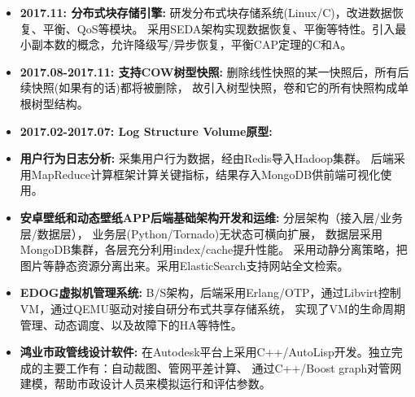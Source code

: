  \begin{itemize}[leftmargin=*]
      \item \textbf{2017.11: 分布式块存储引擎:} 研发分布式块存储系统(Linux/C)，改进数据恢复、平衡、QoS等模块。
          采用SEDA架构实现数据恢复、平衡等特性。引入最小副本数的概念，允许降级写/异步恢复，平衡CAP定理的C和A。

      \item \textbf{2017.08-2017.11: 支持COW树型快照:} 删除线性快照的某一快照后，所有后续快照(如果有的话)都将被删除，
          故引入树型快照，卷和它的所有快照构成单根树型结构。

      \item \textbf{2017.02-2017.07: Log Structure Volume原型:}

      \item \textbf{用户行为日志分析:} 采集用户行为数据，经由Redis导入Hadoop集群。
          后端采用MapReduce计算框架计算关键指标，结果存入MongoDB供前端可视化使用。

      \item \textbf{安卓壁纸和动态壁纸APP后端基础架构开发和运维:} 分层架构（接入层/业务层/数据层），
          业务层(Python/Tornado)无状态可横向扩展，
          数据层采用MongoDB集群，各层充分利用index/cache提升性能。
          采用动静分离策略，把图片等静态资源分离出来。采用ElasticSearch支持网站全文检索。

      \item \textbf{EDOG虚拟机管理系统:} B/S架构，后端采用Erlang/OTP，通过Libvirt控制VM，通过QEMU驱动对接自研分布式共享存储系统，
          实现了VM的生命周期管理、动态调度、以及故障下的HA等特性。

      \item \textbf{鸿业市政管线设计软件:} 在Autodesk平台上采用C++/AutoLisp开发。独立完成的主要工作有：自动裁图、管网平差计算、
          通过C++/Boost graph对管网建模，帮助市政设计人员来模拟运行和评估参数。

  \end{itemize}
